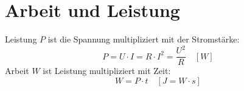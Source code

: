 \section{Arbeit und Leistung}

Leistung $P$ ist die Spannung multipliziert mit der Stromstärke:
\[
	P = U \cdot I = R \cdot I^2 = \frac{U^2}{R}
	\quad \left[ W \right]
\]
Arbeit $W$ ist Leistung multipliziert mit Zeit:
\[
	W = P \cdot t
	\quad \left[ J = W \cdot s \right]
\]
